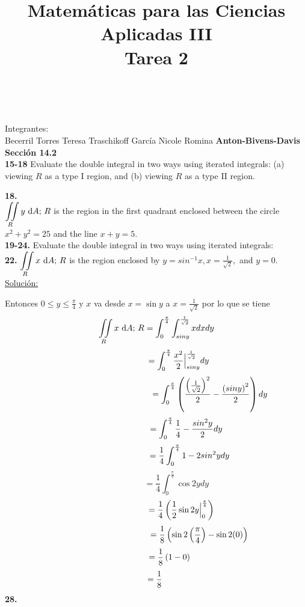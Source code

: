 \documentclass[11pt]{report}
\newcommand{\s}{\underline{Soluci\'{o}n:}}
\begin{document}
{}
\title{Matemáticas para las Ciencias Aplicadas III \\ Tarea 2}
\
\maketitle
Integrantes: \\ 
    Becerril Torres Teresa
    Traschikoff García Nicole Romina
\textbf{Anton-Bivens-Davis} \\

\textbf{Sección 14.2} \\

\textbf{15-18} Evaluate the double integral in two ways using iterated integrals:
(a) viewing $R$ as a type I region, and (b) viewing $R$ as a type II region.

\textbf{18.} \\

$ {\displaystyle \iint \limits_R } \, y \, \, \text dA; \, R$ is the region in
the first quadrant enclosed between the circle $x^2 + y^2 = 25$ and the line
$x + y = 5$. \\

\textbf{19-24.} Evaluate the double integral in two ways using iterated
integrals: \\

\textbf{22.} $ {\displaystyle \iint \limits_R } \, x \, \, \text dA; \, R$
is the region enclosed by $y = sin^{-1} x, x = \frac{1}{\sqrt{2}},$ and $y = 0$.
\\

\s

Entonces $0 \leq y \leq \frac{\pi}{4}$ y $x$ va desde
$x = \sin y$ a $ x = \frac{1}{\sqrt{2}}$  por lo que se tiene
\[{\displaystyle \iint \limits_R } \, x \, \, \text dA; \, R =
\int^{\frac{\pi}{4}}_{0}\int^{\frac{1}{\sqrt{2}}}_{sin y} x dx dy\]
\[\hspace{1.9cm}= \int^{\frac{\pi}{4}}_{0} \frac{x^2}{2} \Big|^{\frac{1}{\sqrt{2}}}_{sin y} dy \]
\[\hspace{4.5cm}= \int^{\frac{\pi}{4}}_{0} \left(\frac{\left(\frac{1}{\sqrt{2}}\right)^2}{2}
- \frac{\left(sin y\right)^2}{2} \right) dy \]
\[\hspace{2.5cm}= \int^{\frac{\pi}{4}}_{0} \frac{1}{4} - \frac{sin^2y}{2} dy\]
\[\hspace{2.8cm}= \frac{1}{4}\int^{\frac{\pi}{4}}_{0} 1 - 2 sin^2y dy\]
\[\hspace{2cm}= \frac{1}{4}\int^{\frac{\pi}{4}}_{0} \cos 2y dy \]
\[\hspace{2.1cm}= \frac{1}{4}\left(\frac{1}{2}\sin2y\Big|^{\frac{\pi}{4}}_{0}\right)\]
\[\hspace{3.6cm}= \frac{1}{8}\left(\sin2\left(\frac{\pi}{4}\right) - \sin2(0)\right)\]
\[\hspace{1.1cm}= \frac{1}{8}\left(1 - 0\right)\]
\[\hspace{-0.1cm}= \frac{1}{8}\]
\textbf{28.} \\
\end{document}
